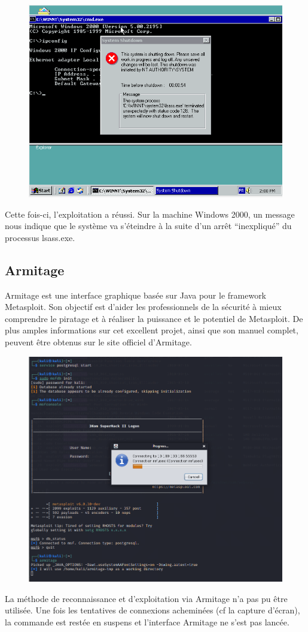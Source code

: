 \documentclass[12pt, oneside]{article}
\begin{document}
\begin{figure}[H]
\centering
\includegraphics[scale=0.4]{Image9}
\end{figure}
Cette fois-ci, l’exploitation a réussi. Sur la machine Windows 2000, un message nous indique que le système va s'éteindre à la suite d’un arrêt “inexpliqué” du processus lsass.exe.

\subsection{Armitage}
Armitage est une interface graphique basée sur Java pour le framework Metasploit. Son objectif est d'aider les professionnels de la sécurité à mieux comprendre le piratage et à réaliser la puissance et le potentiel de Metasploit. De plus amples informations sur cet excellent projet, ainsi que son manuel complet, peuvent être obtenus sur le site officiel d'Armitage.
\begin{figure}[H]
\centering
\includegraphics[scale=0.4]{Image10}
\end{figure}
La méthode de reconnaissance et d’exploitation via Armitage n’a pas pu être utilisée. Une fois les tentatives de connexions acheminées (cf la capture d’écran), la commande est restée en suspens et l’interface Armitage ne s’est pas lancée.
\end{document}
